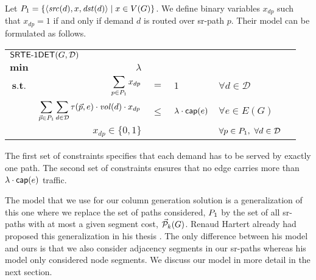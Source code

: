 % 

% 

Let $P_1 = \left\{ \langle \mathit{src}(d), x, \mathit{dst}(d) \rangle \mid x \in V(G) \right\}$. We define binary variables $x_{dp}$ such that $x_{dp} = 1$ if and only if demand $d$ is routed
over sr-path $p$.  Their model can be formulated as follows.

\begin{center}
\begin{tabular}{crcllr}
\multicolumn{5}{l}{$\textsf{SRTE-1DET}(G, \mathcal{D})$} \\[0.5cm] 
$\displaystyle \mathbf{min}$ & $\lambda$ & & & & \\[0.5cm]
$\textbf{s.t.}$ & $\displaystyle \sum_{p \in P_1} x_{d p}$ & $=$ & $1$ & $\forall d \in \mathcal{D}$ \\[0.5cm] 
& $\displaystyle \sum_{\vec{p} \in P_1} \sum_{d \in \mathcal{D}} \tau(\vec{p}, e)  \cdot \mathit{vol}(d) \cdot x_{dp}$ & $\leq$ & $\lambda \cdot \mathsf{cap}(e)$ & $\forall e \in E(G)$ \\[0.5cm]
& $x_{dp} \in \{ 0, 1 \}$ & & & $\forall p \in P_1, \ \forall d \in \mathcal{D}$
\end{tabular}
\end{center}


The first set of constraints specifies that each demand has to be served by exactly one path. The second set of constraints ensures that no edge 
carries more than $\lambda \cdot \mathsf{cap}(e)$ traffic.

The model that we use for our column generation solution is a generalization of this one where we replace the set of paths considered, $P_1$
by the set of all sr-paths with at most a given segment cost, $\mathcal{\vec{P}}_k(G)$. 
Renaud Hartert already had proposed this generalization in his thesis \cite{hartert18}. The only difference between his model and ours is that we also
consider adjacency segments in our sr-paths whereas his model only considered node segments. We discuss our model in more detail in the next section.

